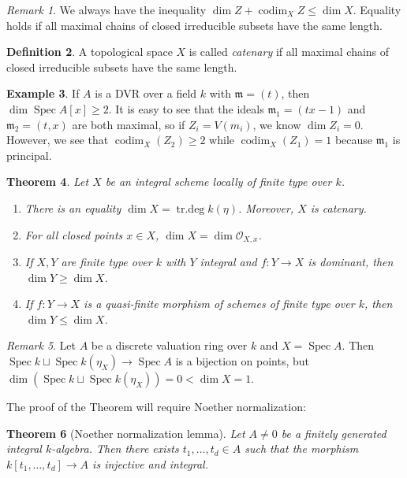 \documentclass[leqno, openany]{memoir}
\newtheorem{thm}{Theorem}[section]
\theoremstyle{definition}
\newtheorem{defn}[thm]{Definition}
\newtheorem{exm}[thm]{Example}
\theoremstyle{remark}
\newtheorem{rmk}[thm]{Remark}
\theoremstyle{plain}
\theoremstyle{definition}
\theoremstyle{remark}
\newcommand{\mc}[1]{\mathcal{#1}}
\newcommand{\mf}[1]{\mathfrak{#1}}
\DeclareMathOperator{\Spec}{Spec}
\DeclareMathOperator{\codim}{codim}
\begin{document}
\begin{rmk}
    We always have the inequality $\dim Z + \codim_X Z \leq \dim X$. Equality holds if all maximal chains of closed irreducible subsets have the same length.
\end{rmk}

\begin{defn}
    A topological space $X$ is called \textit{catenary} if all maximal chains of closed irreducible subsets have the same length. 
\end{defn}

\begin{exm}
    If $A$ is a DVR over a field $k$ with $\mf{m} = (t)$, then $\dim \Spec A[x] \geq 2$. It is easy to see that the ideals $\mf{m}_1 = (tx-1)$ and $\mf{m}_2 = (t,x)$ are both maximal, so if $Z_i = V(m_i)$, we know $\dim Z_i = 0$. However, we see that $\codim_X(Z_2) \geq 2$ while $\codim_X (Z_1) = 1$ because $\mf{m}_1$ is principal.
\end{exm}

\begin{thm}\label{thm:dimfinitetype}
    Let $X$ be an integral scheme locally of finite type over $k$.
    \begin{enumerate}
        \item There is an equality $\dim X = \operatorname{tr.deg} k(\eta)$. Moreover, $X$ is catenary.
        \item For all closed points $x \in X$, $\dim X = \dim \mc{O}_{X,x}$.
        \item If $X, Y$ are finite type over $k$ with $Y$ integral and $f \colon Y \to X$ is dominant, then $\dim Y \geq \dim X$.
        \item If $f \colon Y \to X$ is a quasi-finite morphism of schemes of finite type over $k$, then $\dim Y \leq \dim X$.
    \end{enumerate}
\end{thm}

\begin{rmk}
    Let $A$ be a discrete valuation ring over $k$ and $X = \Spec A$. Then $\Spec k \sqcup \Spec k(\eta_X) \to \Spec A$ is a bijection on points, but $\dim (\Spec k \sqcup \Spec k(\eta_X)) = 0 < \dim X = 1$.
\end{rmk}

The proof of the Theorem will require Noether normalization:
\begin{thm}[Noether normalization lemma]
    Let $A \neq 0$ be a finitely generated integral $k$-algebra. Then there exists $t_1, \ldots, t_d \in A$ such that the morphism $k[t_1, \ldots, t_d] \to A$ is injective and integral.
\end{thm}
\end{document}
